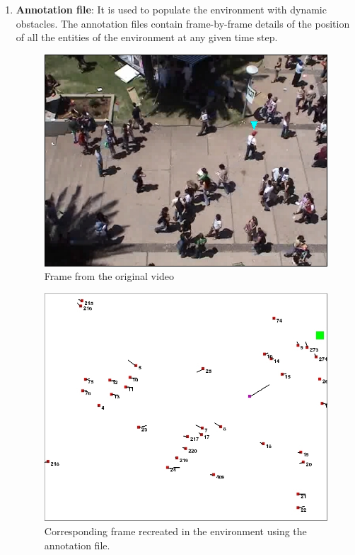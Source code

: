 \begin{enumerate}
\item \textbf{Annotation file}: It is used to populate the environment with dynamic obstacles. The annotation files contain frame-by-frame details of the position of all the entities of the environment at any given time step. 

\begin{figure}[htbp]

		\centering
		\includegraphics[width=.95\linewidth]{figures/video_frame_students_with_agent_pointer.png}
		\caption{Frame from the original video}
		\label{fig:anno_sfig1}
\end{figure}
\vfill
\begin{figure}[htbp]
		\centering
		\includegraphics[width=0.9\linewidth]{figures/env_screenshot.jpg}
		\caption{Corresponding frame recreated in the environment using the annotation file.}
		\label{fig:anno_sfig2}

\end{figure}
\end{enumerate}


